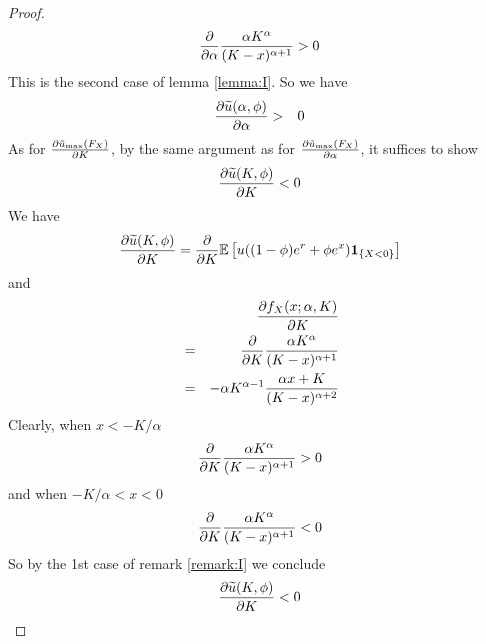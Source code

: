 \documentclass[11pt,a4]{amsart}
\newcommand{\pd}{\partial}
\newcommand{\wt}{\widetilde}
\newcommand{\E }{{\mathbb E}}
\newcommand{\1}{{\mathbf 1}}
\begin{document}
\begin{proof}
  \[
  {\partial \over \partial \alpha} {\alpha K^\alpha \over (K - x)^{\alpha + 1}} > 0
  \]
  This is the second case of lemma \ref{lemma:I}. So we have
  \begin{eqnarray*}
    {\pd \wt u(\alpha, \phi) \over \pd \alpha} &>& 0
  \end{eqnarray*}
  As for ${\pd \tilde u_{\text{max}}(F_X) \over \pd K}$, by the same argument as for
  ${\pd \tilde u_{\text{max}}(F_X) \over \pd \alpha}$, it suffices to show
  \[
  {\pd \wt u(K, \phi) \over \pd K} < 0
  \]
  We have
  \[
  {\pd \wt u(K, \phi) \over \pd K}
  = {\partial \over \partial K} \E \left[
    u((1 - \phi) e^r + \phi e^x) \1_{\{X < 0\}}
  \right] 
  \]
  and
  \begin{eqnarray*}
    && {\pd f_X(x; \alpha, K) \over \pd K} \\
    &=& {\partial \over \partial K} {\alpha K^\alpha \over (K - x)^{\alpha + 1}} \\
    &=&
    -\alpha K^{\alpha - 1} {
      \alpha x + K
      \over
      (K - x)^{\alpha + 2}
    }
  \end{eqnarray*}
  Clearly, when $x < -K/\alpha$
  \[
  {\partial \over \partial K} {\alpha K^\alpha \over (K - x)^{\alpha + 1}} > 0
  \]
  and when $-K/\alpha < x < 0$
  \[
  {\partial \over \partial K} {\alpha K^\alpha \over (K - x)^{\alpha + 1}} < 0
  \]
  So by the 1st case of remark \ref{remark:I} we conclude
  \[
  {\pd \wt u(K, \phi) \over \pd K} < 0  
  \]
\end{proof}
\end{document}
